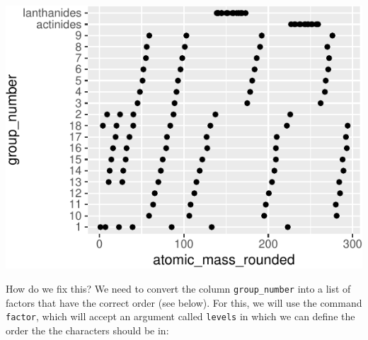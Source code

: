\documentclass[
]{krantz}
\begin{document}
\begin{center}\includegraphics[width=0.8\linewidth]{index_files/figure-latex/unnamed-chunk-190-1} \end{center}

How do we fix this? We need to convert the column \texttt{group\_number} into a list of factors that have the correct order (see below). For this, we will use the command \texttt{factor}, which will accept an argument called \texttt{levels} in which we can define the order the the characters should be in:
\end{document}
